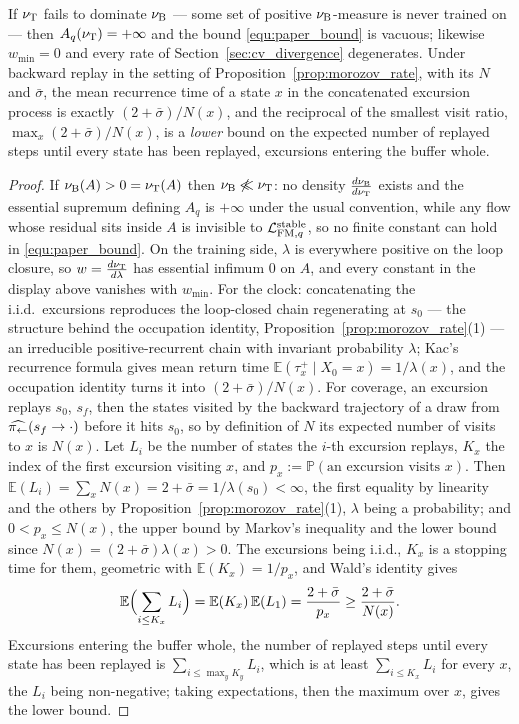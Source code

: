 \begin{lemma}\label{lem:coverage}
If $\nu_{\mathrm{T}}$ fails to dominate $\nu_{\mathrm{B}}$ --- some set of positive $\nu_{\mathrm{B}}$-measure is
never trained on --- then $A_q(\nu_{\mathrm{T}})=+\infty$ and the bound \eqref{equ:paper_bound}
is vacuous; likewise $w_{\min}=0$ and every rate of Section~\ref{sec:cv_divergence}
degenerates. Under backward replay in the setting of Proposition~\ref{prop:morozov_rate},
with its $N$ and $\bar\sigma$, the mean recurrence time of a state $x$ in the concatenated
excursion process is exactly $(2+\bar\sigma)/N(x)$, and the reciprocal of the smallest
visit ratio, $\max_x(2+\bar\sigma)/N(x)$, is a \emph{lower} bound on the expected number
of replayed steps until every state has been replayed, excursions entering the buffer
whole.
\end{lemma}

\begin{proof}
If $\nu_{\mathrm{B}}(A)>0=\nu_{\mathrm{T}}(A)$ then $\nu_{\mathrm{B}}\not\ll\nu_{\mathrm{T}}$: no density
$\frac{d\nu_{\mathrm{B}}}{d\nu_{\mathrm{T}}}$ exists and the essential supremum defining $A_q$ is
$+\infty$ under the usual convention, while any flow whose residual sits inside $A$ is
invisible to $\mathcal L_{\mathrm{FM},q}^{\mathrm{stable}}$, so no finite constant can hold in \eqref{equ:paper_bound}.
On the training side, $\lambda$ is everywhere positive on the loop closure, so
$w=\frac{d\nu_{\mathrm{T}}}{d\lambda}$ has essential infimum $0$ on $A$, and every constant in
the display above vanishes with $w_{\min}$. For the clock: concatenating the i.i.d.\
excursions reproduces the loop-closed chain regenerating at $s_0$ --- the structure
behind the occupation identity, Proposition~\ref{prop:morozov_rate}(1) --- an
irreducible positive-recurrent chain with invariant probability $\lambda$; Kac's
recurrence formula gives mean return time $\mathbb E(\tau_x^+\mid X_0=x)=1/\lambda(x)$, and the
occupation identity turns it into $(2+\bar\sigma)/N(x)$. For coverage, an excursion
replays $s_0$, $s_f$, then the states visited by the backward trajectory of a draw from
$\widehat{\pi_{\leftarrow}}(s_f\rightarrow\cdot)$ before it hits $s_0$, so by definition of $N$
its expected number of visits to $x$ is $N(x)$. Let $L_i$ be the number of states the
$i$-th excursion replays, $K_x$ the index of the first excursion visiting $x$, and
$p_x:=\mathbb P(\text{an excursion visits }x)$. Then
$\mathbb E(L_i)=\sum_xN(x)=2+\bar\sigma=1/\lambda(s_0)<\infty$, the first equality by
linearity and the others by Proposition~\ref{prop:morozov_rate}(1), $\lambda$ being a
probability; and $0<p_x\leq N(x)$, the upper bound by Markov's inequality and the lower bound since
$N(x)=(2+\bar\sigma)\lambda(x)>0$. The excursions being i.i.d., $K_x$ is a stopping time
for them, geometric with $\mathbb E(K_x)=1/p_x$, and Wald's identity gives
\begin{equation*}
    \mathbb E\Bigl(\sum_{i\leq K_x}L_i\Bigr)=\mathbb E(K_x)\,\mathbb E(L_1)
    =\frac{2+\bar\sigma}{p_x}\geq\frac{2+\bar\sigma}{N(x)}.
\end{equation*}
Excursions entering the buffer whole, the number of replayed steps until every state has
been replayed is $\sum_{i\leq\max_yK_y}L_i$, which is at least $\sum_{i\leq K_x}L_i$ for
every $x$, the $L_i$ being non-negative; taking expectations, then the maximum over $x$,
gives the lower bound.
\end{proof}

